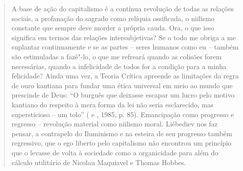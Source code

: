 {\begin{quote}
A base de ação do capitalismo é a contínua revolução de todas as
relações sociais, a profanação do sagrado como relíquia ossificada, o
niilismo constante que sempre deve morder a própria cauda. Ora, o que
isso significa em termos das relações intersubjetivas? Se o todo me
obriga a me suplantar continuamente e se as partes -- seres humanos como
eu -- também são estimuladas a fazê"-lo, o que me refreará quando as
colisões forem necessárias, quando a infelicidade de todos for a
condição para a minha felicidade? Ainda uma vez, a Teoria Crítica
apreende as limitações da regra de ouro kantiana para fundar uma ética
universal em meio ao mundo que prescinde de Deus: ``O burguês que
deixasse escapar um lucro pelo motivo kantiano do respeito à mera forma
da lei não seria esclarecido, mas supersticioso -- um tolo'' ( e
, 1985, p. 85). Emancipação como progresso e regresso --
revolução material como niilismo moral. Liébediev nos faz pensar, a
contrapelo do Iluminismo e na esteira de seu progresso também
regressivo, que o ego liberto pelo capitalismo não encontrou um
princípio que o levasse de volta à sociedade como a organicidade para
além do cálculo utilitário de Nicolau Maquiavel e Thomas Hobbes.


\end{quote}}
